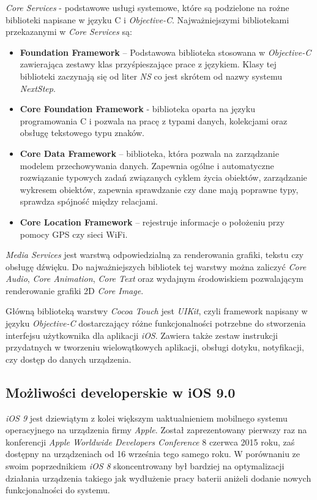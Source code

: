 \documentclass{iiuwb}
\begin{document}
\textit{Core Services} - podstawowe usługi systemowe, które są podzielone na rożne biblioteki napisane w języku C i \textit{Objective-C}. Najważniejszymi bibliotekami przekazanymi w \textit{Core Services} są:
\begin{itemize}
\item \textbf{Foundation Framework} -- Podstawowa biblioteka stosowana w \textit{Objective-C} zawierająca zestawy klas przyśpieszające prace z językiem. Klasy tej biblioteki zaczynają się od liter \textit{NS} co jest skrótem od nazwy systemu \textit{NextStep}.
\item \textbf{Core Foundation Framework} - biblioteka oparta na języku programowania C i pozwala na pracę z typami danych, kolekcjami oraz obsługę tekstowego typu znaków.
\item \textbf{Core Data Framework} -- biblioteka, która pozwala na zarządzanie modelem przechowywania danych. Zapewnia ogólne i automatyczne rozwiązanie typowych zadań związanych cyklem życia obiektów, zarządzanie wykresem obiektów, zapewnia sprawdzanie czy dane mają poprawne typy, sprawdza spójność między relacjami.
\item \textbf{Core Location Framework} -- rejestruje informacje o położeniu przy pomocy GPS czy sieci WiFi.
\end{itemize} 
\textit{Media Services} jest warstwą odpowiedzialną za renderowania grafiki, tekstu czy obsługę dźwięku. Do najważniejszych bibliotek tej warstwy można zaliczyć \textit{Core Audio}, \textit{Core Animation}, \textit{Core Text} oraz wydajnym środowiskiem pozwalającym renderowanie grafiki 2D \textit{Core Image}.

Główną biblioteką warstwy \textit{Cocoa Touch} jest \textit{UIKit}, czyli framework napisany w języku \textit{Objective-C} dostarczający różne funkcjonalności potrzebne do stworzenia interfejsu użytkownika dla aplikacji \textit{iOS}. Zawiera także zestaw instrukcji przydatnych w tworzeniu wielowątkowych aplikacji, obsługi dotyku, notyfikacji, czy dostęp do danych urządzenia.

\subsection{Możliwości developerskie w iOS 9.0}
\textit{iOS 9} jest dziewiątym z kolei większym uaktualnieniem mobilnego systemu operacyjnego na urządzenia firmy \textit{Apple}. Został zaprezentowany pierwszy raz na konferencji \textit{Apple Worldwide Developers Conference} 8 czerwca  2015 roku, zaś dostępny na urządzeniach od 16 września tego samego roku. W porównaniu ze swoim poprzednikiem \textit{iOS 8} skoncentrowany był bardziej na optymalizacji działania urządzenia takiego jak wydłużenie pracy baterii aniżeli dodanie nowych funkcjonalności do systemu. 
\end{document}

